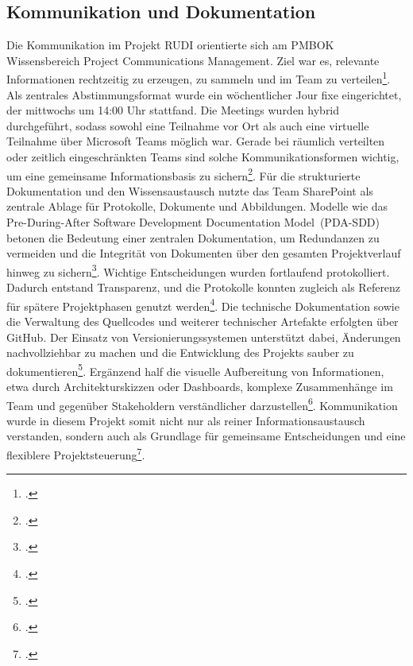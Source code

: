 \documentclass[12pt]{article}
\begin{document}
\subsection{Kommunikation und Dokumentation}
Die Kommunikation im Projekt RUDI orientierte sich am PMBOK Wissensbereich 
\glqq Project Communications Management\grqq. Ziel war es, relevante Informationen 
rechtzeitig zu erzeugen, zu sammeln und im Team zu verteilen\footcite[Vgl.][2--3]{couto-2022}. 
Als zentrales Abstimmungsformat wurde ein wöchentlicher Jour fixe eingerichtet, der mittwochs 
um 14:00 Uhr stattfand. Die Meetings wurden hybrid durchgeführt, sodass sowohl 
eine Teilnahme vor Ort als auch eine virtuelle Teilnahme über Microsoft Teams 
möglich war. Gerade bei räumlich verteilten oder zeitlich eingeschränkten Teams 
sind solche Kommunikationsformen wichtig, um eine gemeinsame Informationsbasis 
zu sichern\footcite[Vgl.][3]{couto-2022}. 
Für die strukturierte Dokumentation und den Wissensaustausch nutzte das Team 
SharePoint als zentrale Ablage für Protokolle, Dokumente und Abbildungen. 
Modelle wie das \glqq Pre-During-After Software Development Documentation Model\grqq\ 
(PDA-SDD) betonen die Bedeutung einer zentralen Dokumentation, um Redundanzen 
zu vermeiden und die Integrität von Dokumenten über den gesamten Projektverlauf 
hinweg zu sichern\footcite[Vgl.][5--6]{alzahrani-2025}. Wichtige 
Entscheidungen wurden fortlaufend protokolliert. Dadurch entstand Transparenz, 
und die Protokolle konnten zugleich als Referenz für spätere Projektphasen 
genutzt werden\footcite[Vgl.][12]{alzahrani-2025}. 
Die technische Dokumentation sowie die Verwaltung des Quellcodes und weiterer 
technischer Artefakte erfolgten über GitHub. Der Einsatz von 
Versionierungssystemen unterstützt dabei, Änderungen nachvollziehbar zu machen 
und die Entwicklung des Projekts sauber zu dokumentieren\footcite[Vgl.][7]{alzahrani-2025}. 
Ergänzend half die visuelle Aufbereitung von Informationen, etwa durch Architekturskizzen 
oder Dashboards, komplexe Zusammenhänge im Team und gegenüber Stakeholdern verständlicher 
darzustellen\footcite[Vgl.][1--2]{couto-2022}. Kommunikation wurde in diesem Projekt 
somit nicht nur als reiner Informationsaustausch verstanden, sondern auch als Grundlage 
für gemeinsame Entscheidungen und eine flexiblere Projektsteuerung\footcite[Vgl.][841--842]{rathor-2024}.
\end{document}
